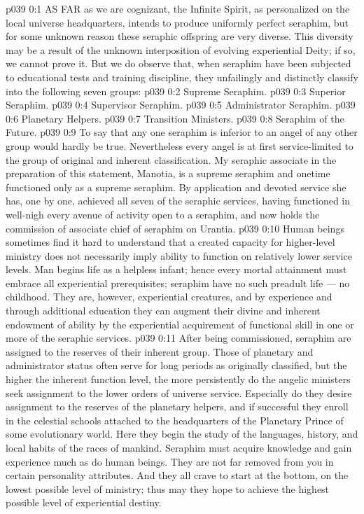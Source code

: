 \vs p039 0:1 AS FAR as we are cognizant, the Infinite Spirit, as personalized on the local universe headquarters, intends to produce uniformly perfect seraphim, but for some unknown reason these seraphic offspring are very diverse. This diversity may be a result of the unknown interposition of evolving experiential Deity; if so, we cannot prove it. But we do observe that, when seraphim have been subjected to educational tests and training discipline, they unfailingly and distinctly classify into the following seven groups:
\vs p039 0:2 \bibnobreakspace Supreme Seraphim.
\vs p039 0:3 \bibnobreakspace Superior Seraphim.
\vs p039 0:4 \bibnobreakspace Supervisor Seraphim.
\vs p039 0:5 \bibnobreakspace Administrator Seraphim.
\vs p039 0:6 \bibnobreakspace Planetary Helpers.
\vs p039 0:7 \bibnobreakspace Transition Ministers.
\vs p039 0:8 \bibnobreakspace Seraphim of the Future.
\vs p039 0:9 \pc To say that any one seraphim is inferior to an angel of any other group would hardly be true. Nevertheless every angel is at first service\hyp{}limited to the group of original and inherent classification. My seraphic associate in the preparation of this statement, Manotia, is a supreme seraphim and onetime functioned only as a supreme seraphim. By application and devoted service she has, one by one, achieved all seven of the seraphic services, having functioned in well\hyp{}nigh every avenue of activity open to a seraphim, and now holds the commission of associate chief of seraphim on Urantia.
\vs p039 0:10 Human beings sometimes find it hard to understand that a created capacity for higher\hyp{}level ministry does not necessarily imply ability to function on relatively lower service levels. Man begins life as a helpless infant; hence every mortal attainment must embrace all experiential prerequisites; seraphim have no such preadult life --- no childhood. They are, however, experiential creatures, and by experience and through additional education they can augment their divine and inherent endowment of ability by the experiential acquirement of functional skill in one or more of the seraphic services.
\vs p039 0:11 After being commissioned, seraphim are assigned to the reserves of their inherent group. Those of planetary and administrator status often serve for long periods as originally classified, but the higher the inherent function level, the more persistently do the angelic ministers seek assignment to the lower orders of universe service. Especially do they desire assignment to the reserves of the planetary helpers, and if successful they enroll in the celestial schools attached to the headquarters of the Planetary Prince of some evolutionary world. Here they begin the study of the languages, history, and local habits of the races of mankind. Seraphim must acquire knowledge and gain experience much as do human beings. They are not far removed from you in certain personality attributes. And they all crave to start at the bottom, on the lowest possible level of ministry; thus may they hope to achieve the highest possible level of experiential destiny.
